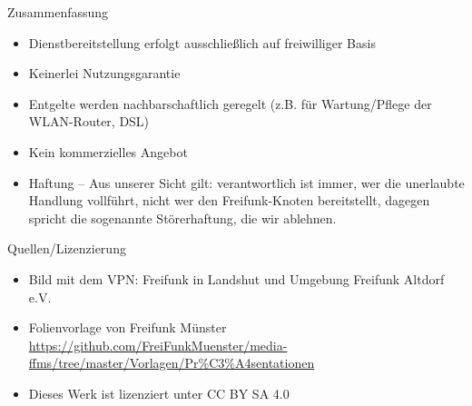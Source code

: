 \documentclass{beamer}
\begin{document}
\begin{frame} {Zusammenfassung}
\begin{itemize}
\item Dienstbereitstellung erfolgt ausschließlich auf freiwilliger Basis
\item Keinerlei Nutzungsgarantie
\item Entgelte werden nachbarschaftlich geregelt (z.B. für Wartung/Pflege der WLAN-Router, DSL)
\item Kein kommerzielles Angebot
\item Haftung – Aus unserer Sicht gilt: verantwortlich ist immer, wer die unerlaubte Handlung vollführt, nicht wer den Freifunk-Knoten bereitstellt, dagegen spricht die sogenannte Störerhaftung, die wir ablehnen.
\end{itemize}
\end{frame}

\begin{frame} {Quellen/Lizenzierung}
\begin{itemize}
\item Bild mit dem VPN: Freifunk in Landshut und Umgebung Freifunk Altdorf e.V.
\item Folienvorlage von Freifunk Münster
 \url{https://github.com/FreiFunkMuenster/media-ffms/tree/master/Vorlagen/Pr\%C3\%A4sentationen}
\item Dieses Werk ist lizenziert unter CC BY SA 4.0
\end{itemize}
\end{frame}
\end{document}
